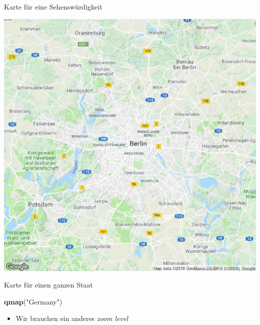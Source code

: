 \documentclass[ignorenonframetext,]{beamer}
\newenvironment{Shaded}{\begin{snugshade}}{\end{snugshade}}
\newcommand{\KeywordTok}[1]{\textcolor[rgb]{0.13,0.29,0.53}{\textbf{#1}}}
\newcommand{\NormalTok}[1]{#1}
\newcommand{\StringTok}[1]{\textcolor[rgb]{0.31,0.60,0.02}{#1}}
\providecommand{\tightlist}{%
  \setlength{\itemsep}{0pt}\setlength{\parskip}{0pt}}
\begin{document}
\begin{frame}{Karte für eine Sehenswürdigkeit}
\protect\hypertarget{karte-fur-eine-sehenswurdigkeit}{}

\includegraphics{figure/BBT_ggmap.pdf}

\end{frame}

\begin{frame}[fragile]{Karte für einen ganzen Staat}
\protect\hypertarget{karte-fur-einen-ganzen-staat}{}

\begin{Shaded}
\begin{Highlighting}[]
\KeywordTok{qmap}\NormalTok{(}\StringTok{"Germany"}\NormalTok{)}
\end{Highlighting}
\end{Shaded}

\begin{itemize}
\tightlist
\item
  Wir brauchen ein anderes \emph{zoom level}
\end{itemize}

\end{frame}
\end{document}
